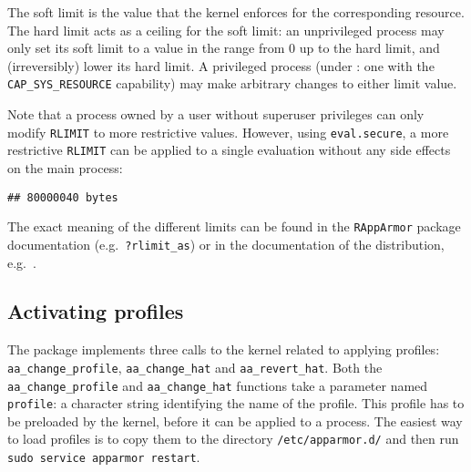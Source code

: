 The soft limit is the value that the kernel enforces for the corresponding
resource. The hard limit acts as a ceiling for the soft limit: an unprivileged
process may only set its soft limit to a value in the range from 0 up to the
hard limit, and (irreversibly) lower its hard limit. A  privileged process
(under  \Linux:  one  with  the \texttt{CAP\_SYS\_RESOURCE} capability) may make
arbitrary changes to either limit value.  \citep{linuxrlimit}



Note that a process owned by a user without superuser privileges can only modify
\texttt{RLIMIT} to more restrictive values. However, using \texttt{eval.secure},
a more restrictive \texttt{RLIMIT} can be applied to a single evaluation without
any side effects on the main process:

\begin{knitrout}\mycodesize
{}\color{fgcolor}\begin{kframe}
\begin{alltt}
 \hlkwb{<-} \hlstd{(}\hlstd{(}\hlstd{),}  \hlstd{=}  \hlopt{*}  \hlopt{*} \hlstd{)}
\end{alltt}


{\ttfamily\noindent\bfseries\color{errorcolor}{\#\# Error: cannot allocate vector of size 76.3 Mb}}\begin{alltt}
 \hlkwb{<-} \hlstd{(}\hlstd{)}
\end{alltt}
\begin{verbatim}
## 80000040 bytes
\end{verbatim}
\end{kframe}
\end{knitrout}


The exact meaning of the different limits can be found in the \texttt{RAppArmor}
package documentation (e.g.\ \texttt{?rlimit\_as}) or in the documentation of
the distribution, e.g.\ \cite{ubunturlimit}.

\subsection{Activating \AppArmor profiles}

The \RAppArmor package implements three calls to the \Linux kernel related
to applying \AppArmor profiles: \texttt{aa\_change\_profile},
\texttt{aa\_change\_hat} and \texttt{aa\_revert\_hat}. Both the
\texttt{aa\_change\_profile} and \texttt{aa\_change\_hat} functions take a
parameter named \texttt{profile}: a character string identifying the name of
the profile. This profile has to be preloaded by the kernel, before it can be
applied to a process. The easiest way to load profiles is to copy them to the
directory \texttt{/etc/apparmor.d/} and then run \texttt{sudo service apparmor
restart}.


